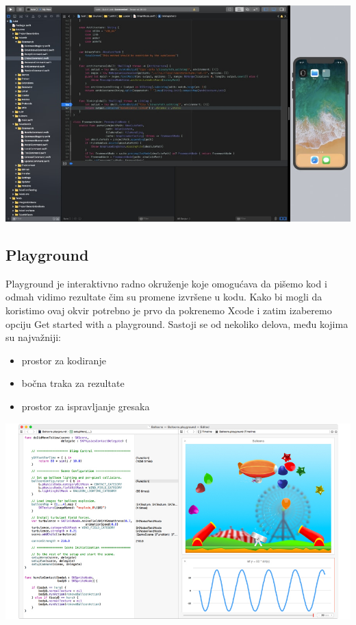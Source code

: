 \documentclass[a4paper]{article}
\begin{document}
\includegraphics[scale=0.2]{xcode.jpg}


\subsection{Playground}
\label{subsec:podnaslovPlayground}
\vspace{5mm}


Playground je interaktivno radno okruženje koje omogućava da pišemo kod i odmah vidimo
rezultate čim su promene izvršene u kodu. Kako bi mogli da koristimo ovaj okvir potrebno je prvo
da pokrenemo Xcode i zatim izaberemo opciju Get started with a playground.
Sastoji se od nekoliko delova, među kojima su najvažniji: 
\begin{itemize}
\item prostor za kodiranje
\item bočna traka za rezultate
\item prostor za ispravljanje gresaka
\end{itemize}
\vspace{5mm}


\includegraphics[scale=0.2]{playground.jpg}
\end{document}

